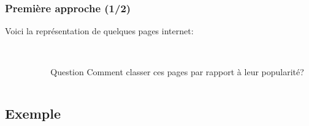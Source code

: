 \documentclass{beamer}
\begin{document}
\begin{frame}
  \frametitle{Première approche (1/2)}
  
  Voici la représentation de quelques pages internet:\\\ \\
  \pause
  \begin{columns}
    \begin{column}[l]{0.05\linewidth}
      \phantom{``e''}
    \end{column}
    \begin{column}[c]{0.45\linewidth}
      \begin{minipage}{0.45\linewidth}
        
      \end{minipage}
    \end{column}
    \begin{column}[r]{0.65\linewidth}
      \begin{minipage}[t]{0.65\linewidth}
        \pause
        \begin{block}{Question}
          Comment classer ces pages par rapport à leur popularité?
        \end{block}
        \end{minipage}
    \end{column}
  \end{columns}
 
 
\end{frame}

\subsection{Exemple}
\end{document}
